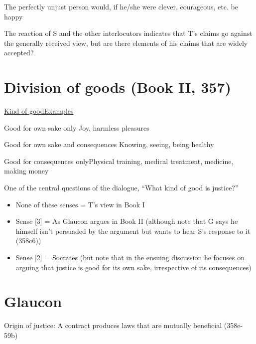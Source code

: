 \documentclass[11pt]{article}
\begin{document}
\noindent The perfectly unjust person would, if he/she were clever, courageous, etc. be happy
\vspace*{2mm}

\noindent The reaction of S and the other interlocutors indicates that T's claims go against the generally received view, but are there elements of his claims that are widely accepted?

\section*{Division of goods (Book II, 357)}

\noindent\underline{Kind of good}\hspace*{55mm}\underline{Examples}
\vspace*{2mm}

\noindent [1] Good for own sake only\hspace*{32mm} Joy, harmless pleasures

\noindent [2] Good for own sake and consequences\hspace*{11mm} Knowing, seeing, being healthy

\noindent [3] Good for consequences only\hspace*{26mm}Physical training, medical treatment, medicine,\\\hspace*{75mm}making money
\vspace*{2mm}

\noindent One of the central questions of the dialogue, ``What kind of good is justice?''
\begin{itemize}\item{None of these senses = T's view in Book I}\item{Sense [3] = As Glaucon argues in Book II (although note that G says he himself isn't persuaded by the argument but wants to hear S's response to it (358c6))}\item{Sense [2] = Socrates (but note that in the ensuing discussion he focuses on arguing that justice is good for its own sake, irrespective of its consequences)}\end{itemize}
\vspace*{-6mm}

\section*{Glaucon}

\noindent Origin of justice: A contract produces laws that are mutually beneficial (358e-59b)
\end{document}
